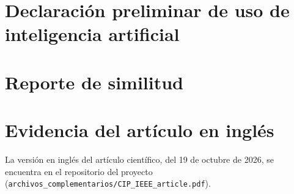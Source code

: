\appendix

\section{Declaración preliminar de uso de inteligencia artificial}


\section{Reporte de similitud}


\section{Evidencia del artículo en inglés}
La versión en inglés del artículo científico, del 19 de octubre de 2026, se encuentra en el repositorio del proyecto (\texttt{archivos\_complementarios/CIP\_IEEE\_article.pdf}).


